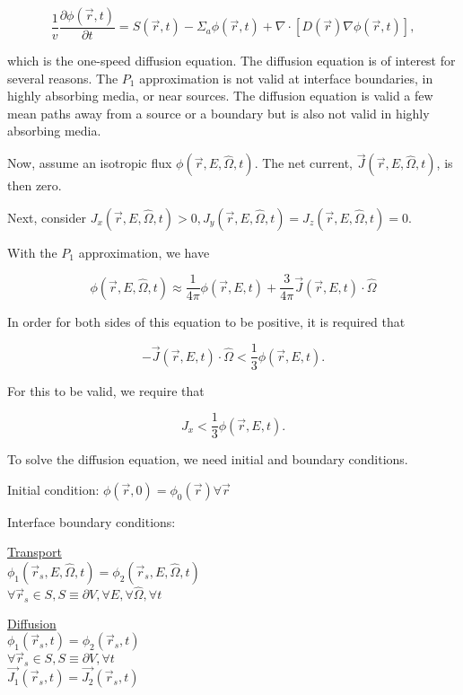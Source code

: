 \documentclass[12pt]{article}
\newcommand{\rvec}{\ensuremath{\vec{r}}}
\newcommand{\omvec}{\ensuremath{\hat{\Omega}}}
\begin{document}
\begin{equation*}
\frac{1}{v}\frac{\partial\phi(\rvec,t)}{\partial t} = S(\rvec,t) - \Sigma_a\phi(\rvec,t) + 
\nabla\cdot[D(\rvec)\nabla\phi(\rvec,t)],
\end{equation*}

which is the one-speed diffusion equation. The diffusion equation is of interest for several reasons. The
$P_1$ approximation is not valid at interface boundaries, in highly absorbing media, or near sources. The
diffusion equation is valid a few mean paths away from a source or a boundary but is also not valid in
highly absorbing media.


Now, assume an isotropic flux $\phi(\rvec,E,\omvec,t)$. The net current, $\vec{J}(\rvec,E,\omvec,t)$, is 
then zero.


Next, consider $J_x(\rvec,E,\omvec,t) > 0, J_y(\rvec,E,\omvec,t) = J_z(\rvec,E,\omvec,t) = 0$.


With the $P_1$ approximation, we have

\begin{equation*}
\phi(\rvec,E,\omvec,t)\approx\frac{1}{4\pi}\phi(\rvec,E,t)+\frac{3}{4\pi}\vec{J}(\rvec,E,t)\cdot\omvec
\end{equation*}

In order for both sides of this equation to be positive, it is required that

\begin{equation*}
-\vec{J}(\rvec,E,t)\cdot\omvec < \frac{1}{3}\phi(\rvec,E,t).
\end{equation*}

For this to be valid, we require that

\begin{equation*}
J_x < \frac{1}{3}\phi(\rvec,E,t).
\end{equation*}

To solve the diffusion equation, we need initial and boundary conditions.


Initial condition: $\phi(\rvec,0) = \phi_0(\rvec) \forall\rvec$


Interface boundary conditions:

\begin{minipage}[t]{0.5\textwidth}
\underline{Transport} \\
$\phi_1(\rvec_s,E,\omvec,t) = \phi_2(\rvec_s,E,\omvec,t)$ \\
$\forall\rvec_s \in S, S \equiv \partial V, \forall E, \forall \omvec, \forall t$
\end{minipage}
\begin{minipage}[t]{0.5\textwidth}
\underline{Diffusion} \\
$\phi_1(\rvec_s,t) = \phi_2(\rvec_s,t)$ \\
$\forall\rvec_s \in S, S \equiv \partial V, \forall t$ \\
$\vec{J_1}(\rvec_s,t) = \vec{J_2}(\rvec_s,t)$
\end{minipage}
\end{document}
